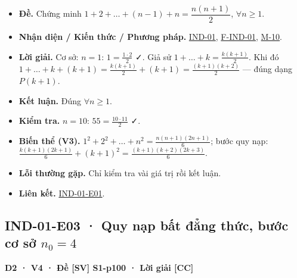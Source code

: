 \documentclass[
  10pt,
  twoside,openany]{book}
\providecommand{\tightlist}{%
  \setlength{\itemsep}{0pt}\setlength{\parskip}{0pt}}
\begin{document}
\begin{itemize}
\tightlist
\item
  \textbf{Đề.} Chứng minh \(1+2+\dots+(n-1)+n=\dfrac{n(n+1)}{2}\),
  \(\forall n\ge1\).
\item
  \textbf{Nhận diện / Kiến thức / Phương pháp.}
  \protect\hyperlink{IND-01}{IND-01},
  \protect\hyperlink{F-IND-01}{F-IND-01},
  \protect\hyperlink{M-10}{M-10}.
\item
  \textbf{Lời giải.} Cơ sở: \(n=1\): \(1=\frac{1\cdot2}{2}\) ✓. Giả sử
  \(1+\dots+k=\frac{k(k+1)}2\). Khi đó
  \(1+\dots+k+(k+1)=\frac{k(k+1)}2+(k+1)=\frac{(k+1)(k+2)}{2}\) --- đúng
  dạng \(P(k+1)\).
\item
  \textbf{Kết luận.} Đúng \(\forall n\ge1\).
\item
  \textbf{Kiểm tra.} \(n=10\): \(55=\frac{10\cdot11}{2}\) ✓.
\item
  \textbf{Biến thể (V3).} \(1^2+2^2+\dots+n^2=\frac{n(n+1)(2n+1)}{6}\);
  bước quy nạp:
  \(\frac{k(k+1)(2k+1)}6+(k+1)^2=\frac{(k+1)(k+2)(2k+3)}{6}\).
\item
  \textbf{Lỗi thường gặp.} Chỉ kiểm tra vài giá trị rồi kết luận.
\item
  \textbf{Liên kết.} \protect\hyperlink{IND-01-E01}{IND-01-E01}.
\end{itemize}

\hypertarget{IND-01-E03}{%
\subsection{\texorpdfstring{IND-01-E03 · Quy nạp bất đẳng thức, bước cơ
sở
\(n_0=4\)}{IND-01-E03 · Quy nạp bất đẳng thức, bước cơ sở n\_0=4}}\label{IND-01-E03}}

\textbf{D2 · V4 · Đề {[}SV{]} S1-p100 · Lời giải {[}CC{]}}
\end{document}
